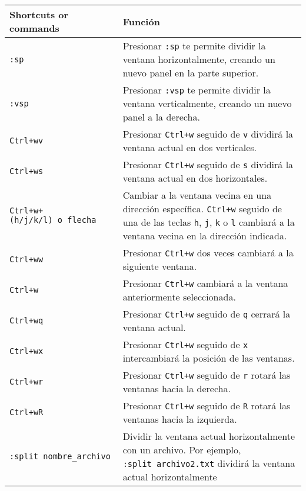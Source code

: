 \documentclass[
  doc,
  floatsintext,
  longtable,
  a4paper,
  nolmodern,
  notxfonts,
  notimes,
  colorlinks=true,linkcolor=blue,citecolor=blue,urlcolor=blue]{apa7}
\begin{document}
\begin{longtable}[]{@{}
  >{\raggedright\arraybackslash}p{}
  >{\raggedright\arraybackslash}p{}@{}}
\toprule\noalign{}
\begin{minipage}[b]{\linewidth}\raggedright
Shortcuts or commands
\end{minipage} & \begin{minipage}[b]{\linewidth}\raggedright
Función
\end{minipage} \\
\midrule\noalign{}
\endhead
\bottomrule\noalign{}
\endlastfoot
\texttt{:sp} & Presionar \texttt{:sp} te permite dividir la ventana
horizontalmente, creando un nuevo panel en la parte superior. \\
\texttt{:vsp} & Presionar \texttt{:vsp} te permite dividir la ventana
verticalmente, creando un nuevo panel a la derecha. \\
\texttt{Ctrl+wv} & Presionar \texttt{Ctrl+w} seguido de \texttt{v}
dividirá la ventana actual en dos verticales. \\
\texttt{Ctrl+ws} & Presionar \texttt{Ctrl+w} seguido de \texttt{s}
dividirá la ventana actual en dos horizontales. \\
\texttt{Ctrl+w+(h/j/k/l)\ o\ flecha} & Cambiar a la ventana vecina en
una dirección específica. \texttt{Ctrl+w} seguido de una de las teclas
\texttt{h}, \texttt{j}, \texttt{k} o \texttt{l} cambiará a la ventana
vecina en la dirección indicada. \\
\texttt{Ctrl+ww} & Presionar \texttt{Ctrl+w} dos veces cambiará a la
siguiente ventana. \\
\texttt{Ctrl+w} & Presionar \texttt{Ctrl+w} cambiará a la ventana
anteriormente seleccionada. \\
\texttt{Ctrl+wq} & Presionar \texttt{Ctrl+w} seguido de \texttt{q}
cerrará la ventana actual. \\
\texttt{Ctrl+wx} & Presionar \texttt{Ctrl+w} seguido de \texttt{x}
intercambiará la posición de las ventanas. \\
\texttt{Ctrl+wr} & Presionar \texttt{Ctrl+w} seguido de \texttt{r}
rotará las ventanas hacia la derecha. \\
\texttt{Ctrl+wR} & Presionar \texttt{Ctrl+w} seguido de \texttt{R}
rotará las ventanas hacia la izquierda. \\
\texttt{:split\ nombre\_archivo} & Dividir la ventana actual
horizontalmente con un archivo. Por ejemplo,
\texttt{:split\ archivo2.txt} dividirá la ventana actual horizontalmente

\end{longtable}
\end{document}
